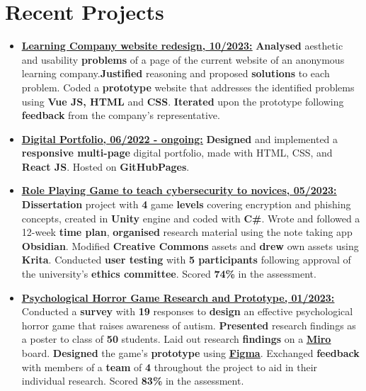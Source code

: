 \documentclass[11pt]{article}
\newcommand{\ulink}[2]{\href{#1}{\uline{#2}}}
\begin{document}
    \section{Recent Projects}
    \begin{itemize}[itemsep=3pt, leftmargin=1em]
        \item \ulink{https://orbit-9j.github.io/LearningCompanyRedesign/index.html}{\textbf{Learning Company website redesign, 10/2023:}} \textbf{Analysed} aesthetic and usability \textbf{problems} of a page of the current website of an anonymous learning company.\textbf{Justified} reasoning and proposed \textbf{solutions} to each problem. Coded a \textbf{prototype} website that addresses the identified problems using \textbf{Vue JS, HTML} and \textbf{CSS}. \textbf{Iterated} upon the prototype following \textbf{feedback} from the company's representative.
       \item \ulink{https://orbit-9j.github.io/Portfolio/}{\textbf{Digital Portfolio, 06/2022 - ongoing:}} \textbf{Designed} and implemented a \textbf{responsive multi-page} digital portfolio, made with HTML, CSS, and \textbf{React JS}. Hosted on \textbf{GitHubPages}.
       \item \ulink{https://orbit-9j.github.io/Portfolio/\#/Cyberscape:\%20a\%20Cybersecurity\%20RPG}{\textbf{Role Playing Game to teach cybersecurity to novices, 05/2023:}} \textbf{Dissertation} project with \textbf{4} game \textbf{levels} covering encryption and phishing concepts, created in \textbf{Unity} engine and coded with \textbf{C\#}. Wrote and followed a 12-week \textbf{time plan}, \textbf{organised} research material using the note taking app \textbf{Obsidian}. Modified \textbf{Creative Commons} assets and \textbf{drew} own assets using \textbf{Krita}. Conducted \textbf{user testing} with \textbf{5 participants} following approval of the university's \textbf{ethics committee}. Scored \textbf{74\%} in the assessment.
        \item \ulink{https://orbit-9j.github.io/Portfolio/\#/Psychodyssey}{\textbf{Psychological Horror Game Research and Prototype, 01/2023:}} Conducted a \textbf{survey} with \textbf{19} responses to \textbf{design} an effective psychological horror game that raises awareness of autism. \textbf{Presented} research findings as a poster to class of \textbf{50} students. Laid out research \textbf{findings} on a \textbf{\ulink{https://miro.com/app/board/uXjVPMzhjBo=/?share_link_id=722803847643}{Miro}} board. \textbf{Designed} the game's \textbf{prototype} using \textbf{\ulink{https://www.figma.com/file/pyHXkKKN4cn5MtXx4WpAHR/design-cw?t=gjgzJrZM4Dd0YaZP-1}{Figma}}. Exchanged \textbf{feedback} with members of a \textbf{team} of \textbf{4} throughout the project to aid in their individual research. Scored \textbf{83\%} in the assessment.        
    \end{itemize} 
\end{document}
